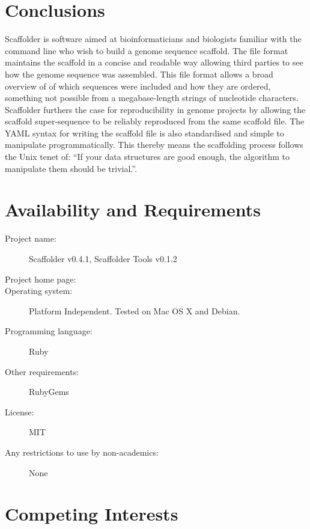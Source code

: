 \documentclass[10pt]{bmc_article}
\newenvironment{bmcformat}{\begin{raggedright}\baselineskip20pt\sloppy\setboolean{publ}{false}}{\end{raggedright}\baselineskip20pt\sloppy}
\begin{document}
\begin{bmcformat}
\clearpage

\section*{Conclusions} %

Scaffolder is software aimed at bioinformaticians and biologists familiar with
the command line who wish to build a genome sequence scaffold. The file format
maintains the scaffold in a concise and readable way allowing third parties to
see how the genome sequence was assembled. This file format allows a broad
overview of of which sequences were included and how they are ordered,
something not possible from a megabase-length strings of nucleotide characters.
Scaffolder furthers the case for reproducibility in genome projects by allowing
the scaffold super-sequence to be reliably reproduced from the same scaffold
file. The YAML syntax for writing the scaffold file is also standardised and
simple to manipulate programmatically. This thereby means the scaffolding
process follows the Unix tenet of: ``If your data structures are good enough,
the algorithm to manipulate them should be trivial.''.

\clearpage

\section*{Availability and Requirements} %

  \begin{description}
    \item[Project name:] Scaffolder v0.4.1, Scaffolder Tools v0.1.2
    \item[Project home page:] \scaffolder
    \item[Operating system:] Platform Independent. Tested on Mac OS X and
    Debian.
    \item[Programming language:] Ruby
    \item[Other requirements:] RubyGems
    \item[License:] MIT
    \item[Any restrictions to use by non-academics:] None
  \end{description}

\clearpage

\section*{Competing Interests} %


\end{bmcformat}
\end{document}
